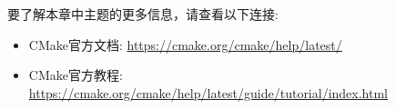 要了解本章中主题的更多信息，请查看以下连接:

\begin{itemize}
\item 
CMake官方文档: \url{https://cmake.org/cmake/help/latest/}

\item 
CMake官方教程: \url{https://cmake.org/cmake/help/latest/guide/tutorial/index.html}
\end{itemize}















